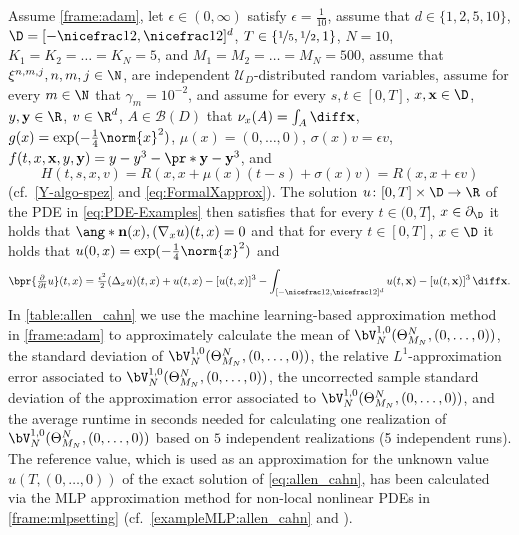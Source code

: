 Assume 
	\cref{frame:adam}, 
let
	$\epsilon\in(0,\infty)$
satisfy
	$\epsilon = \tfrac{1}{10}$,
assume that
	$d\in\{1,2,5,10\}$,
	$\D = [-\nicefrac12,\nicefrac12]^d$,
	$T\in\{\nicefrac{1}{5},\nicefrac{1}{2},1\}$,
	$N=10$,
	$K_1 = K_2 = \ldots = K_N= 5$, and
	$M_1 = M_2 = \ldots = M_N = 500$,
assume that 
	$\xi^{n,m,j}, n, m, j \in \N$,
	are independent $\mathcal{U}_{D}$-distributed random variables,
assume 
	for every 
		$m \in \N$
	that
		$\gamma_m =10^{-2}$,
	and
assume 
	for every 
		$s,t \in [0,T]$, 
		$x,\mathbf{x}
		\in \D$, 
		$y,\mathbf{y} \in \R$,
		$v\in\R^d$,
		$A \in \mathcal{B}(D)$
	that
		$\nu_x(A) = \int_A \diff\mathbf{x}$,
		$g(x)= \exp (-\tfrac{1}{4}\norm{x}^2)$,
		$\mu(x)=(0, \dots, 0)$,
		$\sigma(x) v = \epsilon v$, 
		$f(t,x,\mathbf{x},y,\mathbf{y}
		)=  y - y^3 - \pr*{ \mathbf{y} - \mathbf{y}^3}$, and
	\begin{equation}
		\label{eq:Hallencahn}
		H(t,s,x,v) 
		=
		R(x,x+\mu(x)(t-s)+\sigma(x)v)
		=
		R(x,x+\epsilon v)
	\end{equation}
	(cf.\ \eqref{Y-algo-spez} and \eqref{eq:FormalXapprox}).
The solution 
	$u\colon[0,T]\times \D \to \R$ 
	of the PDE in \eqref{eq:PDE-Examples} then satisfies that 
		for every
		$t\in (0,T]$, 
		$x\in\partial_\D$
	it holds that
		$\ang*{\mathbf{n}(x) ,(\nabla_x u)(t,x)} = 0$
	and that for every
			$t\in [0,T]$, 
			$x\in\D$ 
		it holds that 
			$u(0,x)=\exp (-\tfrac{1}{4}\norm{x}^2)$ and
		\begin{equation}
			\bpr{\tfrac{\partial}{\partial t}u}(t,x)
			=
			\tfrac{\epsilon^2}{2} (\Delta_x u)(t,x) + u(t,x) - [u(t,x)]^3 - \int_{[-\nicefrac12,\nicefrac12]^d} u(t,\mathbf{x}) - [u(t,\mathbf{x})]^3 \,\diff\mathbf{x}
			.
		\label{eq:allen_cahn}
		\end{equation}
%
%
In \cref{table:allen_cahn}
we use the machine learning-based approximation method
in \cref{frame:adam}
to approximately calculate
the mean of %
$
\bV^{1,0}_N(\Theta^N_{M_N},\allowbreak (0,\ldots,0))
$,
the standard deviation of %
$
\bV^{1,0}_N(\Theta^N_{M_N},\allowbreak (0,\ldots,0))
$,
the relative $ L^1 $-approximation error associated to %
$
\bV^{1,0}_N(\Theta^N_{M_N},\allowbreak (0,\ldots,\allowbreak 0))
$,
the uncorrected sample standard deviation of the approximation error associated to %
$
\bV^{1,0}_N(\Theta^N_{M_N},\allowbreak (0,\ldots,0))
$,
and the average runtime in seconds needed for calculating one realization of $
\bV^{1,0}_N(\Theta^N_{M_N},\allowbreak (0,\ldots,0))
$
%
based on $5$ independent realizations (5 independent runs).
%
The reference value, which is used as an approximation for the unknown value $u(T,(0,\ldots,0))$
of the exact solution of \eqref{eq:allen_cahn}, has been calculated via the MLP approximation method for non-local nonlinear PDEs in \cref{frame:mlpsetting} (cf.~\cref{exampleMLP:allen_cahn} and \cite[Remark~3.3]{Beck2017a}).

